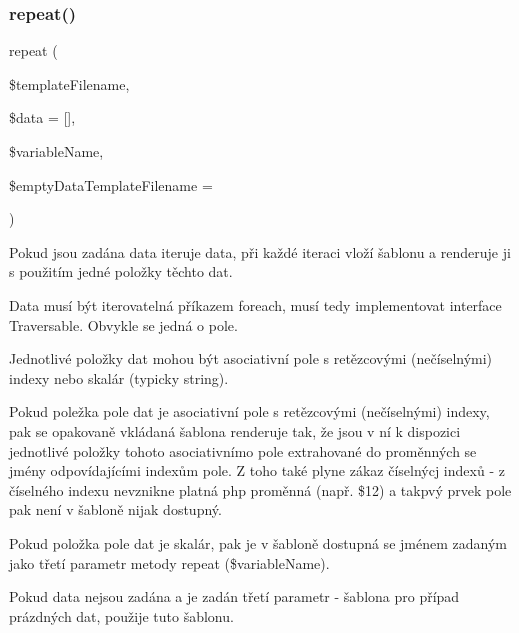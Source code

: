 \mbox{\label{interface_pes_1_1_view_1_1_renderer_1_1_php_template_functions_interface_a8870e42f6c064494fd5a8c1aeb0855f9}} 
\subsubsection{\texorpdfstring{repeat()}{repeat()}}
{\footnotesize\ttfamily repeat (\begin{DoxyParamCaption}\item[{}]{\$template\+Filename,  }\item[{}]{\$data = {\ttfamily \mbox{[}\mbox{]}},  }\item[{}]{\$variable\+Name,  }\item[{}]{\$empty\+Data\+Template\+Filename = {\ttfamily \textquotesingle{}\textquotesingle{}} }\end{DoxyParamCaption})}

Pokud jsou zadána data iteruje data, při každé iteraci vloží šablonu a renderuje ji s použitím jedné položky těchto dat.

Data musí být iterovatelná příkazem foreach, musí tedy implementovat interface Traversable. Obvykle se jedná o pole. 

Jednotlivé položky dat mohou být asociativní pole s retězcovými (nečíselnými) indexy nebo skalár (typicky string). 

Pokud poležka pole dat je asociativní pole s retězcovými (nečíselnými) indexy, pak se opakovaně vkládaná šablona renderuje tak, že jsou v ní k dispozici jednotlivé položky tohoto asociativnímo pole extrahované do proměnných se jmény odpovídajícími indexům pole. Z toho také plyne zákaz číselnýcj indexů -\/ z číselného indexu nevznikne platná php proměnná (např. \$12) a takpvý prvek pole pak není v šabloně nijak dostupný. 

Pokud položka pole dat je skalár, pak je v šabloně dostupná se jménem zadaným jako třetí parametr metody repeat (\$variable\+Name). 

Pokud data nejsou zadána a je zadán třetí parametr -\/ šablona pro případ prázdných dat, použije tuto šablonu. 

